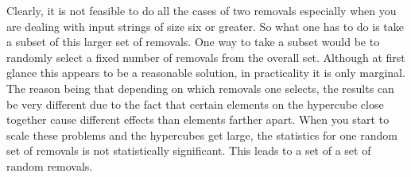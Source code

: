 	Clearly, it is not feasible to do all the cases of two
removals especially when you are dealing with input strings of size
six or greater.  So what one has to do is take a subset of this larger
set of removals.  One way to take a subset would be to randomly select
a fixed number of removals from the overall set.  Although at first
glance this appears to be a reasonable solution, in practicality it is
only marginal.  The reason being that depending on which removals one
selects, the results can be very different due to the fact that
certain elements on the hypercube close together cause different
effects than elements farther apart.  When you start to scale these
problems and the hypercubes get large, the statistics for one random
set of removals is not statistically significant.  This leads to a set
of a set of random removals.


